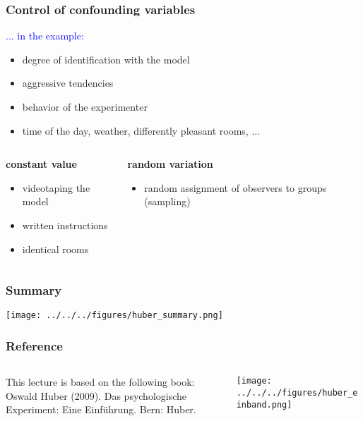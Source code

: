 \documentclass[]{beamer}
\begin{document}
\begin{frame}
\frametitle{Control of confounding variables}
\textcolor{blue}{... in the example:}
\begin{itemize}
 \item degree of identification with the model
 \item aggressive tendencies
 \item behavior of the experimenter
 \item time of the day, weather, differently pleasant rooms, ...
\end{itemize}
\begin{columns}[T]
 \begin{column}{5cm}
   \begin{center} \textbf{constant value} \end{center}
 \begin{itemize}
  \item videotaping the model
  \item written instructions
  \item identical rooms
 \end{itemize}
 \end{column}

 \begin{column}{5cm}
\begin{center}\textbf{ random variation}\end{center}
 \begin{itemize}
  \item random assignment of observers to groups (\alert{sampling})
 \end{itemize}
 \end{column}
\end{columns}
\end{frame}



\begin{frame}
\frametitle{Summary}
\texttt{[image: ../../../figures/huber\_summary.png]}
\end{frame}

\begin{frame}
 \frametitle{Reference}
\begin{columns}[T]
 \begin{column}{60mm}
This lecture is based on the following book: \\

Oswald Huber (2009). Das psychologische Experiment: Eine Einf\"uhrung. Bern:
Huber.
 \end{column}
 \begin{column}{40mm}
\texttt{[image: ../../../figures/huber\_einband.png]}
 \end{column}
\end{columns}
\end{frame}
\end{document}
